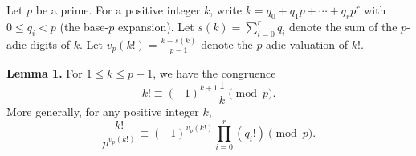 Let $p$ be a prime. For a positive integer $k$, write $k = q_0 + q_1 p + \cdots + q_r p^r$ with $0 \leq q_i < p$ (the base-$p$ expansion). Let $s(k) = \sum_{i=0}^r q_i$ denote the sum of the $p$-adic digits of $k$. Let $v_p(k!) = \frac{k - s(k)}{p-1}$ denote the $p$-adic valuation of $k!$.

\textbf{Lemma 1.} For $1 \leq k \leq p-1$, we have the congruence
$$k! \equiv (-1)^{k+1} \frac{1}{k} \pmod{p}.$$
More generally, for any positive integer $k$,
$$\frac{k!}{p^{v_p(k!)}} \equiv (-1)^{v_p(k!)} \prod_{i=0}^r (q_i!) \pmod{p}.$$
